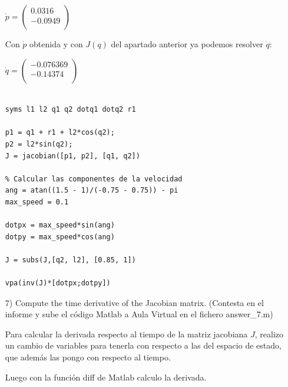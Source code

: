 \documentclass[a4paper]{article}
\begin{document}
\begin{itemize}
\begin{center}
	$\dot{p} = \begin{pmatrix}
		0.0316\\       
		-0.0949\\       
	\end{pmatrix}$
\end{center}

Con $\dot{p}$ obtenida y con $J(q)$ del apartado anterior ya podemos resolver $\dot{q}$:

\begin{center}
	$\dot{q} = \begin{pmatrix}
		-0.076369\\       
		-0.14374\\       
	\end{pmatrix}$
\end{center}

\bigskip

\begin{tcolorbox}[width=12cm, title={File \texttt{answer\_6.m}}]
\begin{scriptsize}
\begin{verbatim}

syms l1 l2 q1 q2 dotq1 dotq2 r1

p1 = q1 + r1 + l2*cos(q2);
p2 = l2*sin(q2);
J = jacobian([p1, p2], [q1, q2])

% Calcular las componentes de la velocidad
ang = atan((1.5 - 1)/(-0.75 - 0.75)) - pi
max_speed = 0.1

dotpx = max_speed*sin(ang)
dotpy = max_speed*cos(ang)

J = subs(J,[q2, l2], [0.85, 1])

vpa(inv(J)*[dotpx;dotpy])

\end{verbatim}
\end{scriptsize}
\end{tcolorbox}


\item[7)] 
 {\color{gray} Compute the time derivative of the Jacobian matrix. (Contesta en el informe y sube el c\'odigo Matlab a Aula Virtual en el fichero answer\_7.m)}

\bigskip

Para calcular la derivada respecto al tiempo de la matriz jacobiana $J$, realizo un cambio de variables para tenerla con respecto a las del espacio de estado, que además las pongo con respecto al tiempo.

Luego con la función diff de Matlab calculo la derivada.


\end{itemize}
\end{document}

